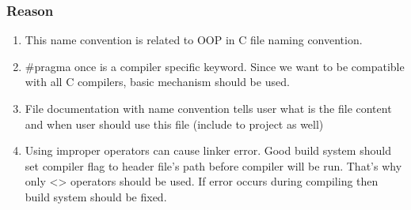 \subsubsection{Reason}
    \begin{enumerate}
        \item This name convention is related to OOP in C file naming convention.
        \item \#pragma once is a compiler specific keyword. Since we want to be compatible with all C compilers, basic mechanism should be used.
        \item File documentation with name convention tells user what is the file content and when user should use this file (include to project as well)
        \item Using improper operators can cause linker error. Good build system should set compiler flag to header file's path before compiler will be run. That's why only <> operators should be used. If error occurs during compiling then build system should be fixed.
    \end{enumerate}
    